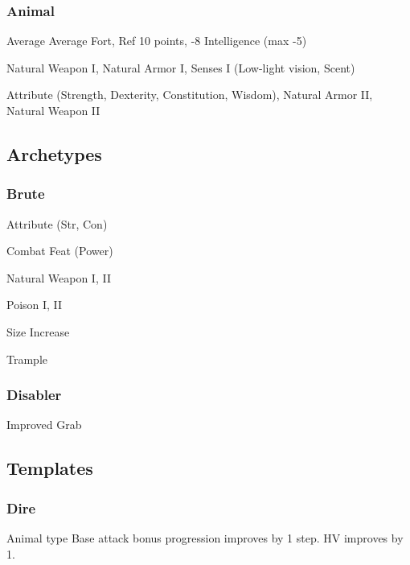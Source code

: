 \subsubsection{Animal}
\tbab Average
\tsaves Average Fort, Ref
 10 points, -8 Intelligence (max -5)

 Natural Weapon I, Natural Armor I, Senses I (Low-light vision, Scent)

 Attribute (Strength, Dexterity, Constitution, Wisdom), Natural Armor II, Natural Weapon II

\subsection{Archetypes}

\subsubsection{Brute}
\begin{itemize*}
    \item Attribute (Str, Con)
    \item Combat Feat (Power)
    \item Natural Weapon I, II
    \item Poison I, II
    \item Size Increase
    \item Trample
\end{itemize*}

\subsubsection{Disabler}
\begin{itemize*}
    \item Improved Grab
\end{itemize*}

\subsection{Templates}
\subsubsection{Dire}
\featpre Animal type
\featben Base attack bonus progression improves by 1 step. HV improves by 1.
